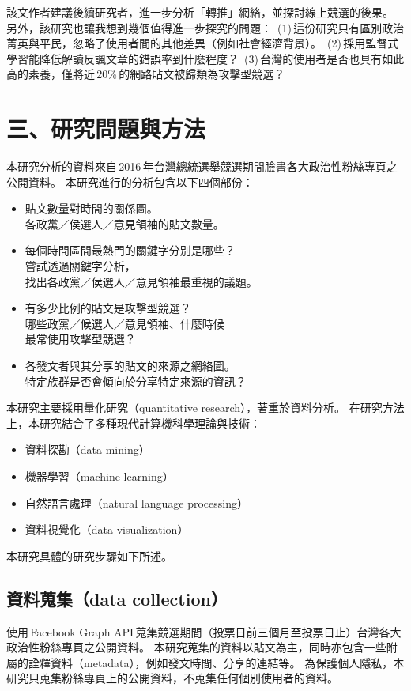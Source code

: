 \documentclass[letterpaper, 10pt, conference]{ieeeconf}   %
\begin{document}
\begin{CJK*}{UTF8}{bsmi}
該文作者建議後續研究者，進一步分析「轉推」網絡，並探討線上競選的後果。
另外，該研究也讓我想到幾個值得進一步探究的問題：
\,(1)\,這份研究只有區別政治菁英與平民，忽略了使用者間的其他差異（例如社會經濟背景）。
\,(2)\,採用監督式學習能降低解讀反諷文章的錯誤率到什麼程度？
\,(3)\,台灣的使用者是否也具有如此高的素養，僅將近\,20\%\,的網路貼文被歸類為攻擊型競選？

\section*{三、研究問題與方法}

本研究分析的資料來自\,2016\,年台灣總統選舉競選期間臉書各大政治性粉絲專頁之公開資料。
本研究進行的分析包含以下四個部份：
\begin{itemize}
\item 貼文數量對時間的關係圖。\\
各政黨／侯選人／意見領袖的貼文數量。
\item 每個時間區間最熱門的關鍵字分別是哪些？\\
嘗試透過關鍵字分析，\\
找出各政黨／侯選人／意見領袖最重視的議題。
\item 有多少比例的貼文是攻擊型競選？\\
哪些政黨／候選人／意見領袖、什麼時候\\
最常使用攻擊型競選？
\item 各發文者與其分享的貼文的來源之網絡圖。\\
特定族群是否會傾向於分享特定來源的資訊？
\end{itemize}

本研究主要採用量化研究（quantitative research），著重於資料分析。
在研究方法上，本研究結合了多種現代計算機科學理論與技術：
\begin{itemize}
\item 資料探勘（data mining）
\item 機器學習（machine learning）
\item 自然語言處理（natural language processing）
\item 資料視覺化（data visualization）
\end{itemize}

本研究具體的研究步驟如下所述。

\subsection*{資料蒐集（data collection）}

使用\,Facebook Graph API\,蒐集競選期間（投票日前三個月至投票日止）台灣各大政治性粉絲專頁之公開資料。
本研究蒐集的資料以貼文為主，同時亦包含一些附屬的詮釋資料（metadata），例如發文時間、分享的連結等。
為保護個人隱私，本研究只蒐集粉絲專頁上的公開資料，不蒐集任何個別使用者的資料。


\end{CJK*}
\end{document}
